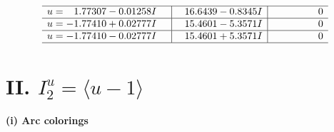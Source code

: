 \documentclass[1p]{elsarticle_modified}
\theoremstyle{definition}
\begin{document}
$$\begin{array}{c|c|c}
 \hline 
\begin{aligned}
u &= \phantom{-}1.77307 - 0.01258 I\end{aligned}
 & \phantom{-}16.6439 - 0.8345 I & \phantom{-0.000000 } 0 \\ \hline\begin{aligned}
u &= -1.77410 + 0.02777 I\end{aligned}
 & \phantom{-}15.4601 - 5.3571 I & \phantom{-0.000000 } 0 \\ \hline\begin{aligned}
u &= -1.77410 - 0.02777 I\end{aligned}
 & \phantom{-}15.4601 + 5.3571 I & \phantom{-0.000000 } 0\\
 \hline 
 \end{array}$$\newpage\newpage\renewcommand{\arraystretch}{1}
\centering \section*{II. $I^u_{2}= \langle u-1 \rangle$}
\flushleft \textbf{(i) Arc colorings}\\
\end{document}
